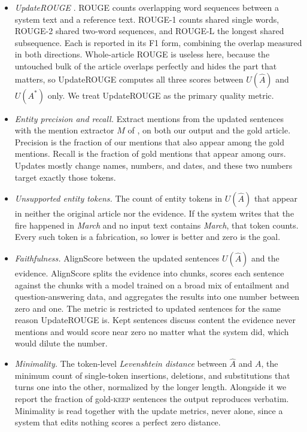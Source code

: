\documentclass[]{paper}
\newcommand{\keep}{\textsc{keep}}
\begin{document}
\begin{itemize}
\item \emph{UpdateROUGE} \citep{iv-etal-2022-fruit}. ROUGE counts overlapping word sequences between a system text and a reference text. ROUGE-1 counts shared single words, ROUGE-2 shared two-word sequences, and ROUGE-L the longest shared subsequence. Each is reported in its F1 form, combining the overlap measured in both directions. Whole-article ROUGE is useless here, because the untouched bulk of the article overlaps perfectly and hides the part that matters, so UpdateROUGE computes all three scores between $U(\hat{A})$ and $U(A^\ast)$ only. We treat UpdateROUGE as the primary quality metric.
\item \emph{Entity precision and recall.} Extract mentions from the updated sentences with the mention extractor $M$ of , on both our output and the gold article. Precision is the fraction of our mentions that also appear among the gold mentions. Recall is the fraction of gold mentions that appear among ours. Updates mostly change names, numbers, and dates, and these two numbers target exactly those tokens.
\item \emph{Unsupported entity tokens.} The count of entity tokens in $U(\hat{A})$ that appear in neither the original article nor the evidence. If the system writes that the fire happened in \emph{March} and no input text contains \emph{March}, that token counts. Every such token is a fabrication, so lower is better and zero is the goal.
\item \emph{Faithfulness.} AlignScore \citep{zha-etal-2023-alignscore} between the updated sentences $U(\hat{A})$ and the evidence. AlignScore splits the evidence into chunks, scores each sentence against the chunks with a model trained on a broad mix of entailment and question-answering data, and aggregates the results into one number between zero and one. The metric is restricted to updated sentences for the same reason UpdateROUGE is. Kept sentences discuss content the evidence never mentions and would score near zero no matter what the system did, which would dilute the number.
\item \emph{Minimality.} The token-level \emph{Levenshtein distance} between $\hat{A}$ and $A$, the minimum count of single-token insertions, deletions, and substitutions that turns one into the other, normalized by the longer length. Alongside it we report the fraction of gold-\keep{} sentences the output reproduces verbatim. Minimality is read together with the update metrics, never alone, since a system that edits nothing scores a perfect zero distance.

\end{itemize}
\end{document}
